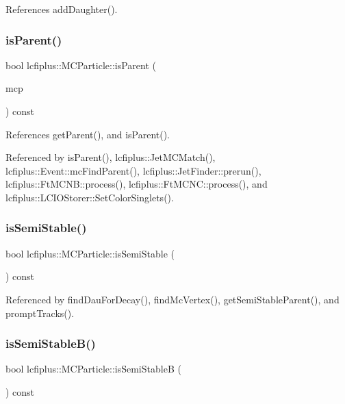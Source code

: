 References add\+Daughter().

\mbox{\label{classlcfiplus_1_1MCParticle_a49af9906cd3adc458ef2542fc1c41266}} 
\subsubsection{is\+Parent()}
{\footnotesize\ttfamily bool lcfiplus\+::\+M\+C\+Particle\+::is\+Parent (\begin{DoxyParamCaption}\item[{const \textbf{ M\+C\+Particle} $\ast$}]{mcp }\end{DoxyParamCaption}) const}



References get\+Parent(), and is\+Parent().



Referenced by is\+Parent(), lcfiplus\+::\+Jet\+M\+C\+Match(), lcfiplus\+::\+Event\+::mc\+Find\+Parent(), lcfiplus\+::\+Jet\+Finder\+::prerun(), lcfiplus\+::\+Ft\+M\+C\+N\+B\+::process(), lcfiplus\+::\+Ft\+M\+C\+N\+C\+::process(), and lcfiplus\+::\+L\+C\+I\+O\+Storer\+::\+Set\+Color\+Singlets().

\mbox{\label{classlcfiplus_1_1MCParticle_a911e9be04ba61023ccc947e6706a9b4e}} 
\subsubsection{is\+Semi\+Stable()}
{\footnotesize\ttfamily bool lcfiplus\+::\+M\+C\+Particle\+::is\+Semi\+Stable (\begin{DoxyParamCaption}{ }\end{DoxyParamCaption}) const}



Referenced by find\+Dau\+For\+Decay(), find\+Mc\+Vertex(), get\+Semi\+Stable\+Parent(), and prompt\+Tracks().

\mbox{\label{classlcfiplus_1_1MCParticle_a8b526e383f652384cfe955425c201ca1}} 
\subsubsection{is\+Semi\+Stable\+B()}
{\footnotesize\ttfamily bool lcfiplus\+::\+M\+C\+Particle\+::is\+Semi\+StableB (\begin{DoxyParamCaption}{ }\end{DoxyParamCaption}) const}



